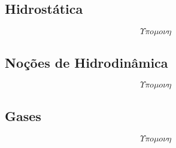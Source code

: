 \subsection{Hidrostática}
    \[ \Upsilon \pi o \mu o \nu \eta \]
\subsection{Noções de Hidrodinâmica}
    \[ \Upsilon \pi o \mu o \nu \eta \]
\subsection{Gases}
    \[ \Upsilon \pi o \mu o \nu \eta \]